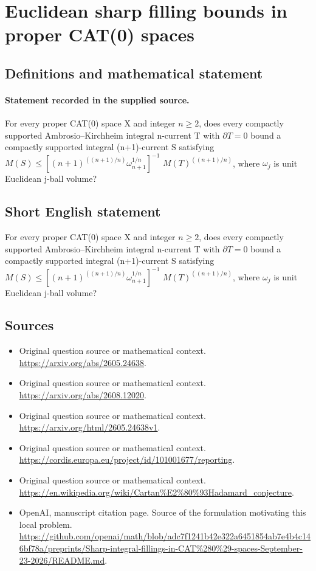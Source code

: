 \documentclass[11pt]{article}
\begin{document}
\section*{Euclidean sharp filling bounds in proper CAT(0) spaces}\label{statement}
\subsection{Definitions and mathematical statement}
\paragraph{Statement recorded in the supplied source.}
For every proper CAT(0) space X and integer $n\geq 2$, does every compactly supported Ambrosio–Kirchheim integral n-current T with $\partial T=0$ bound a compactly supported integral (n+1)-current S satisfying $M(S)\leq [(n+1)^((n+1)/n)\omega _{n+1}^{1/n}]^{-1}$ $M(T)^((n+1)/n)$, where $\omega _j$ is unit Euclidean j-ball volume?
\subsection{Short English statement}
For every proper CAT(0) space X and integer $n\geq 2$, does every compactly supported Ambrosio–Kirchheim integral n-current T with $\partial T=0$ bound a compactly supported integral (n+1)-current S satisfying $M(S)\leq [(n+1)^((n+1)/n)\omega _{n+1}^{1/n}]^{-1}$ $M(T)^((n+1)/n)$, where $\omega _j$ is unit Euclidean j-ball volume?
\subsection{Sources}
\begin{itemize}
\item[S1] Original question source or mathematical context.
\url{https://arxiv.org/abs/2605.24638}.
\item[S2] Original question source or mathematical context.
\url{https://arxiv.org/abs/2608.12020}.
\item[S3] Original question source or mathematical context.
\url{https://arxiv.org/html/2605.24638v1}.
\item[S4] Original question source or mathematical context.
\url{https://cordis.europa.eu/project/id/101001677/reporting}.
\item[S5] Original question source or mathematical context.
\url{https://en.wikipedia.org/wiki/Cartan%E2%80%93Hadamard_conjecture}.
\item[S6] OpenAI, manuscript citation page. Source of the formulation motivating this local problem.
\url{https://github.com/openai/math/blob/adc7f1241b42e322a6451854ab7e4b4c146bf78a/preprints/Sharp-integral-fillings-in-CAT%280%29-spaces-September-23-2026/README.md}.
\end{itemize}
\end{document}
